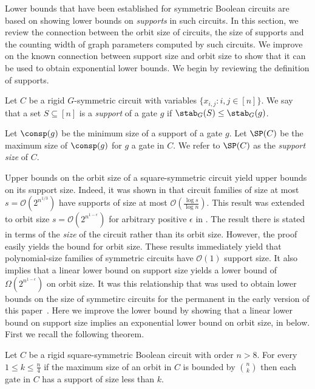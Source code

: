 \documentclass{toc}
\begin{document}
Lower bounds that have been established for symmetric Boolean circuits are based on showing lower bounds on \emph{supports} in such circuits.  In this section, we review the connection between the orbit size of circuits, the size of supports and the counting width of graph parameters computed by such circuits.  We improve on the known connection between support size and orbit size to show that it can be used to obtain exponential lower bounds.  We begin by reviewing the definition of supports.

\begin{definition}
  Let $C$ be a rigid $G$-symmetric circuit with variables $\{x_{i, j}: i, j \in
  [n]\}$. We say that
  a set $S \subseteq [n]$ is a \emph{support} of a gate $g$ if
  $\stab_G(S) \leq \stab_G(g)$.
\end{definition}

Let $\consp(g)$ be the minimum size of a support of a gate $g$. Let $\SP(C)$ be
the maximum size of $\consp(g)$ for $g$ a gate in $C$.  We refer to $\SP(C)$ as the \emph{support size} of $C$.

Upper bounds on the orbit size of a square-symmetric circuit yield upper bounds on its support size.  Indeed, it was shown in \cite[Theorem~4]{AndersonD17} that circuit families of size at most $s = \mathcal{O}(2^{n^{1/3}})$ have supports of size at most $\mathcal{O}(\frac{\log s}{\log n})$.   This result was extended to orbit size $s = \mathcal{O}(2^{n^{1-\epsilon}})$ for arbitrary positive $\epsilon$ in \cite[Theorem~1]{AtseriasDO19}.  The result there is stated in terms of the
\emph{size} of the circuit rather than its orbit size.  However, the
proof easily yields the bound for orbit size.  These results
immediately yield that polynomial-size families of symmetric circuits
have $\mathcal{O}(1)$ support size.  It also implies that a linear
lower bound on support size yields a lower bound of
$\Omega(2^{n^{1-\epsilon}})$ on orbit size.  It was this relationship
that was used to obtain lower bounds on the size of symmetirc circuits
for the permanent in the early version of this paper~\cite{conf-version}.
Here we improve the lower bound by showing that a linear lower bound
on support size implies an exponential lower bound on orbit size, in
 below.  First we recall the
following theorem.

\begin{theorem}
  Let $C$ be a rigid square-symmetric Boolean circuit with order $n > 8$. For
  every $1 \leq k \leq \frac{n}{4}$ if the maximum size of an orbit in $C$ is
  bounded by $\binom{n}{k}$ then each gate in $C$ has a support of size less
  than $k$.
  \label{thm:support-theorem-general}
\end{theorem}
\end{document}
